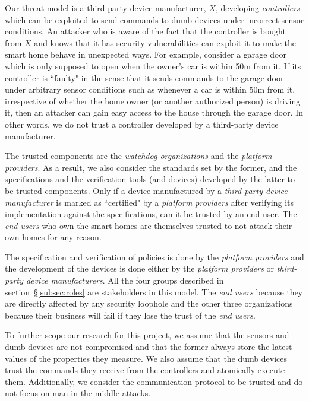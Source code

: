 \documentclass{article}
\begin{document}
Our threat model is a third-party device manufacturer, $X$, developing \textit{controllers} which can be exploited to send commands to dumb-devices under incorrect sensor conditions. An attacker who is aware of the fact that the controller is bought from $X$ and knows that it has security vulnerabilities can exploit it to make the smart home behave in unexpected ways. For example, consider a garage door which is only supposed to open when the owner's car is within 50m from it. If its controller is ``faulty" in the sense that it sends commands to the garage door under arbitrary sensor conditions such as whenever a car is within 50m from it, irrespective of whether the home owner (or another authorized person) is driving it, then an attacker can gain easy access to the house through the garage door. 
In other words, we do not trust a controller developed by a third-party device manufacturer. 

The trusted components are the \textit{watchdog organizations} and the \textit{platform providers}. As a result, we also consider the standards set by the former, and the specifications and the verification tools (and devices) developed by the latter to be trusted components.
Only if a device manufactured by a \textit{third-party device manufacturer} is marked as ``certified" by a \textit{platform providers} after verifying its implementation against the specifications, can it be trusted by an end user. 
The \textit{end users} who own the smart homes are themselves trusted to not attack their own homes for any reason. 

The specification and verification of policies is done by the \textit{platform providers} and the development of the devices is done either by the \textit{platform providers} or \textit{third-party device manufacturers}. All the four groups described in section~\S\ref{subsec:roles} are stakeholders in this model. The \textit{end users} because they are directly affected by any security loophole and the other three organizations because their business will fail if they lose the trust of the \textit{end users}.

 To further scope our research for this project, we assume that the sensors and dumb-devices are not compromised and that the former always store the latest values of the properties they measure. We also assume that the dumb devices trust the commands they receive from the controllers and atomically execute them. Additionally, we consider the communication protocol to be trusted and do not focus on man-in-the-middle attacks.
\end{document}
